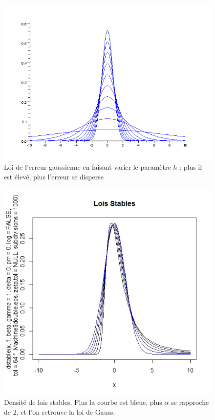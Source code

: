 \documentclass{beamer}
\begin{document}
\begin{frame}
\begin{figure}[!h]\centering
\includegraphics[scale=0.25]{Gaussienne.png}
\caption{Loi de l'erreur gaussienne en faisant varier le paramètre $h$ : plus il est élevé, plus l'erreur se disperse}
\label{fig:Gaussienne}
\end{figure}
\end{frame}

\begin{frame}
\begin{figure}[!h]\centering
\includegraphics[scale=0.25]{Stables.jpeg}
\caption{Densité de lois stables. Plus la courbe est bleue, plus $\alpha$ se rapproche de $2$, et l'on retrouve la loi de Gauss.}
\label{fig:Stables}
\end{figure}
\end{frame}
\end{document}
